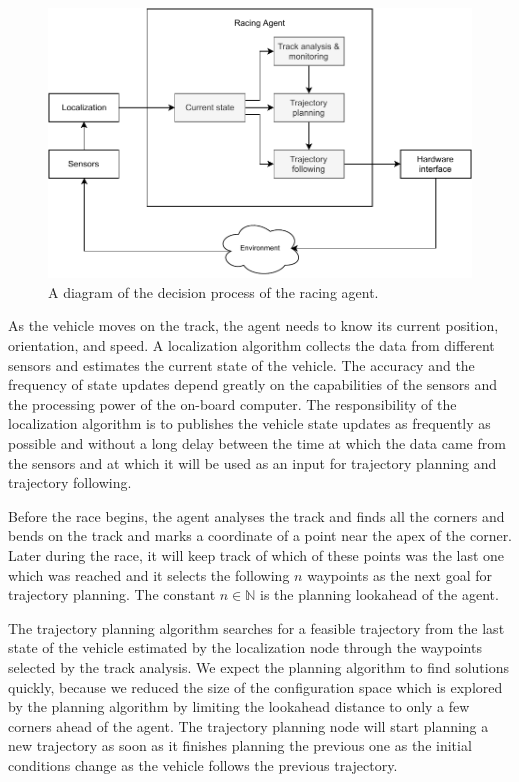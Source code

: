\begin{figure}[p]\centering
\includegraphics[width=125mm]{../img/racing_agent_diagram.pdf}
\caption{A diagram of the decision process of the racing agent.}
\label{fig:racing_agent_diagram}
\end{figure}

As the vehicle moves on the track, the agent needs to know its current position, orientation, and speed. A localization algorithm collects the data from different sensors and estimates the current state of the vehicle. The accuracy and the frequency of state updates depend greatly on the capabilities of the sensors and the processing power of the on-board computer. The responsibility of the localization algorithm is to publishes the vehicle state updates as frequently as possible and without a long delay between the time at which the data came from the sensors and at which it will be used as an input for trajectory planning and trajectory following.

Before the race begins, the agent analyses the track and finds all the corners and bends on the track and marks a coordinate of a point near the apex of the corner. Later during the race, it will keep track of which of these points was the last one which was reached and it selects the following $n$ waypoints as the next goal for trajectory planning. The constant $n\in\mathbb{N}$ is the planning lookahead of the agent.

The trajectory planning algorithm searches for a feasible trajectory from the last state of the vehicle estimated by the localization node through the waypoints selected by the track analysis. We expect the planning algorithm to find solutions quickly, because we reduced the size of the configuration space which is explored by the planning algorithm by limiting the lookahead distance to only a few corners ahead of the agent. The trajectory planning node will start planning a new trajectory as soon as it finishes planning the previous one as the initial conditions change as the vehicle follows the previous trajectory.


